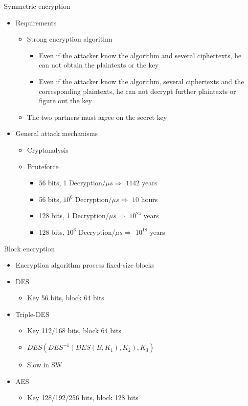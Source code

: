 \documentclass{beamer}
\begin{document}
\begin{frame}{Symmetric encryption}
  \begin{itemize}
  \item Requirements
    \begin{itemize}
  \item Strong encryption algorithm
    \begin{itemize}
      \item Even if the attacker know the algorithm and several
        ciphertexts, he can not obtain the plaintexts or the key
      \item Even if the attacker know the algorithm, several
        ciphertexts and the corresponding plaintexts,
        he can not decrypt further plaintexts or figure out the key
    \end{itemize}
  \item The two partners must agree on the secret key
    \end{itemize}
  \item<2-> General attack mechanisms
    \begin{itemize}
      \item Cryptanalysis
      \item Bruteforce
        \begin{itemize}
          \item <3->56 bits, 1 Decryption/$\mu s \Rightarrow$ $1142$ years
          \item <3->56 bits, $10^6$ Decryption/$\mu s \Rightarrow$
            $10$ hours
          \item <3->128 bits, 1 Decryption/$\mu s \Rightarrow$ $10^{24}$ years
          \item <3->128 bits, $10^6$ Decryption/$\mu s \Rightarrow$
            $10^{18}$ years
        \end{itemize}
    \end{itemize}
  \end{itemize}
\end{frame}

\begin{frame}{Block encryption}
  \begin{itemize}
  \item Encryption algorithm process fixed-size blocks
  \item<2-> DES
    \begin{itemize}
      \item Key 56 bits, block 64 bits
    \end{itemize}
  \item<3-> Triple-DES
    \begin{itemize}
    \item Key 112/168 bits, block 64 bits
    \item $DES(DES^{-1}(DES(B,K_1), K_2), K_3)$
    \item Slow in SW
    \end{itemize}
  \item<4-> AES
    \begin{itemize}
    \item Key 128/192/256 bits, block 128 bits
    \end{itemize}
  \end{itemize}
\end{frame}
\end{document}
